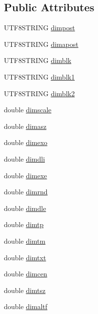 \subsection*{Public Attributes}
\begin{DoxyCompactItemize}
\item 
U\-T\-F8\-S\-T\-R\-I\-N\-G \hyperlink{classDRW__Dimstyle_ab4484303cfced1d7ad3c19a84b19dada}{dimpost}
\item 
U\-T\-F8\-S\-T\-R\-I\-N\-G \hyperlink{classDRW__Dimstyle_a933deca82de6d15d82ada90f8731a00b}{dimapost}
\item 
U\-T\-F8\-S\-T\-R\-I\-N\-G \hyperlink{classDRW__Dimstyle_a2f64034b5654fee47038933c565a2e51}{dimblk}
\item 
U\-T\-F8\-S\-T\-R\-I\-N\-G \hyperlink{classDRW__Dimstyle_a33a57c5c614537649e042eef57a03f9d}{dimblk1}
\item 
U\-T\-F8\-S\-T\-R\-I\-N\-G \hyperlink{classDRW__Dimstyle_a65761962dbaff5d150f4a9296efeadfc}{dimblk2}
\item 
double \hyperlink{classDRW__Dimstyle_a2b9d92349258970f08efd3bd25d8cfd2}{dimscale}
\item 
double \hyperlink{classDRW__Dimstyle_ae0ea0ac39cd2e961ccf4c3b54c570967}{dimasz}
\item 
double \hyperlink{classDRW__Dimstyle_a22b63c5e53a889bfd549cc476e5bdd4a}{dimexo}
\item 
double \hyperlink{classDRW__Dimstyle_a6d13f43f1689621623c4193501ddb5cc}{dimdli}
\item 
double \hyperlink{classDRW__Dimstyle_af1d89fe302b0147db6db850a6382b743}{dimexe}
\item 
double \hyperlink{classDRW__Dimstyle_abe4aea95c5bf8eca979c33d94ea2bb07}{dimrnd}
\item 
double \hyperlink{classDRW__Dimstyle_a7aebc776b75660bc9947a90416bf8ab4}{dimdle}
\item 
double \hyperlink{classDRW__Dimstyle_a6596806a922534a220ce3b7f7b4bb415}{dimtp}
\item 
double \hyperlink{classDRW__Dimstyle_a80ccee76ee51137e11097fc61bc81329}{dimtm}
\item 
double \hyperlink{classDRW__Dimstyle_a8cc804b4094615949f6b314375d2e726}{dimtxt}
\item 
double \hyperlink{classDRW__Dimstyle_a3b2ea8efe76c60db85c14dcc8724a7f6}{dimcen}
\item 
double \hyperlink{classDRW__Dimstyle_a4b8018caf9bdf34b2002efce8929dc57}{dimtsz}
\item 
double \hyperlink{classDRW__Dimstyle_a0ccbe896838b874d8bdf263b48e7cee6}{dimaltf}

\end{DoxyCompactItemize}
